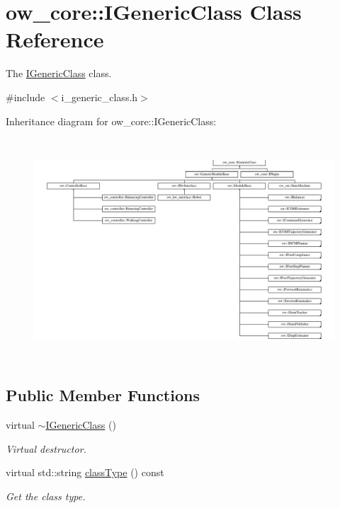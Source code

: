 \hypertarget{classow__core_1_1IGenericClass}{}\section{ow\+\_\+core\+:\+:I\+Generic\+Class Class Reference}
\label{classow__core_1_1IGenericClass}


The \hyperlink{classow__core_1_1IGenericClass}{I\+Generic\+Class} class.  




{\ttfamily \#include $<$i\+\_\+generic\+\_\+class.\+h$>$}

Inheritance diagram for ow\+\_\+core\+:\+:I\+Generic\+Class\+:\begin{figure}[H]
\begin{center}
\leavevmode
\includegraphics[height=8.334884cm]{da/d72/classow__core_1_1IGenericClass}
\end{center}
\end{figure}
\subsection*{Public Member Functions}
\begin{DoxyCompactItemize}
\item 
virtual \hyperlink{classow__core_1_1IGenericClass_aa0bef13a4de1a0fed78a8e3d3d8a417e}{$\sim$\+I\+Generic\+Class} ()\hypertarget{classow__core_1_1IGenericClass_aa0bef13a4de1a0fed78a8e3d3d8a417e}{}\label{classow__core_1_1IGenericClass_aa0bef13a4de1a0fed78a8e3d3d8a417e}

\begin{DoxyCompactList}\small\item\em Virtual destructor. \end{DoxyCompactList}\item 
virtual std\+::string \hyperlink{classow__core_1_1IGenericClass_ad6ca32fd7189a4bd71c01c10e3677ae4}{class\+Type} () const 
\begin{DoxyCompactList}\small\item\em Get the class type. \end{DoxyCompactList}\end{DoxyCompactItemize}
